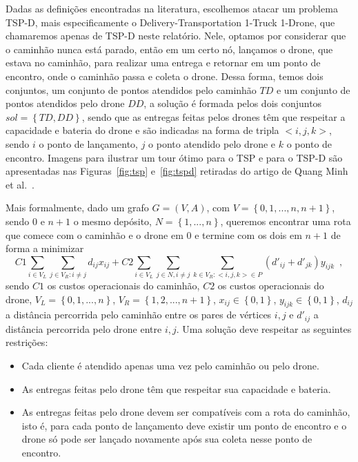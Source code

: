 \documentclass[12pt, a4paper]{article}
\begin{document}
Dadas as definições encontradas na literatura, escolhemos atacar um problema TSP-D, mais especificamente o Delivery-Transportation 1-Truck 1-Drone, que chamaremos apenas de TSP-D neste relatório. Nele, optamos por considerar que o caminhão nunca está parado, então em um certo nó, lançamos o drone, que estava no caminhão, para realizar uma entrega e retornar em um ponto de encontro, onde o caminhão passa e coleta o drone. Dessa forma, temos dois conjuntos, um conjunto de pontos atendidos pelo caminhão $TD$ e um conjunto de pontos atendidos pelo drone $DD$, a solução é formada pelos dois conjuntos $sol = \left\{TD, DD\right\}$, sendo que as entregas feitas pelos drones têm que respeitar a capacidade e bateria do drone e são indicadas na forma de tripla ${<}i, j, k{>}$, sendo $i$ o ponto de lançamento, $j$ o ponto atendido pelo drone e $k$ o ponto de encontro. Imagens para ilustrar um tour ótimo para o TSP e para o TSP-D são apresentadas nas Figuras~\ref{fig:tsp} e~\ref{fig:tspd} retiradas do artigo de Quang Minh et al.~\cite{ha2018min}.\par
Mais formalmente, dado um grafo $G = \left(V, A\right)$, com $V = \left\{0, 1,...,n,n+1\right\}$, sendo $0$ e $n+1$ o mesmo depósito, $N = \left\{1,...,n\right\}$, queremos encontrar uma rota que comece com o caminhão e o drone em $0$ e termine com os dois em $n+1$ de forma a minimizar 
$$
C1 \sum_{i \in V_L} \sum_{j \in V_R: i \neq j} d_{ij} x_{ij} + C2 \sum_{i \in V_L} \sum_{j \in N, i \neq j} \sum_{k \in V_R: <i, j, k> \in P} \left(d'_{ij} + d'_{jk}\right) y_{ijk} \enspace,
$$
sendo $C1$ os custos operacionais do caminhão, $C2$ os custos operacionais do drone, $V_L = \left\{0,1,...,n\right\}$, $V_R = \left\{1,2,...,n+1\right\}$, $x_{ij} \in \left\{0, 1\right\}$, $y_{ijk} \in \left\{0, 1\right\}$, $d_{ij}$ a distância percorrida pelo caminhão entre os pares de vértices $i, j$ e $d'_{ij}$ a distância percorrida pelo drone entre $i, j$. Uma solução deve respeitar as seguintes restrições: 
\begin{itemize}
	\item Cada cliente é atendido apenas uma vez pelo caminhão ou pelo drone.
	\item As entregas feitas pelo drone têm que respeitar sua capacidade e bateria.
	\item As entregas feitas pelo drone devem ser compatíveis com a rota do caminhão, isto é, para cada ponto de lançamento deve existir um ponto de encontro e o drone só pode ser lançado novamente após sua coleta nesse ponto de encontro.
\end{itemize}
  
\end{document}
